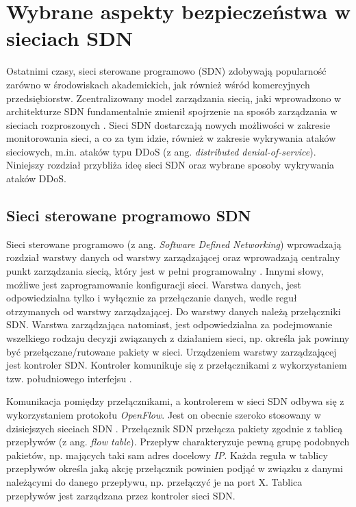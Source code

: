 \chapter{Wybrane aspekty bezpieczeństwa w sieciach SDN }

Ostatnimi czasy, sieci sterowane programowo (SDN) zdobywają popularność zarówno
w środowiskach akademickich, jak również wśród komercyjnych przedsiębiorstw.
Zcentralizowany model zarządzania siecią, jaki wprowadzono w architekturze SDN
fundamentalnie zmienił spojrzenie na sposób zarządzania w sieciach rozproszonych
\cite{ddosNYarticle}. Sieci SDN dostarczają nowych możliwości w zakresie
monitorowania sieci, a co za tym idzie, również w zakresie wykrywania ataków
sieciowych, m.in. ataków typu DDoS (z ang. \textit{distributed
  denial-of-service}). Niniejszy rozdział przybliża ideę sieci SDN oraz wybrane
sposoby wykrywania ataków DDoS. 

\section{Sieci sterowane programowo SDN}
Sieci sterowane programowo (z ang. \textit{Software Defined Networking})
wprowadzają rozdział warstwy danych od warstwy zarządzającej oraz wprowadzają
centralny punkt zarządzania siecią, który jest w pełni programowalny \cite{onf}.
Innymi słowy, możliwe jest zaprogramowanie konfiguracji sieci. Warstwa danych,
jest odpowiedzialna tylko i wyłącznie za przełączanie danych, wedle reguł
otrzymanych od warstwy zarządzającej. Do warstwy danych należą przełączniki SDN.
Warstwa zarządzająca natomiast, jest odpowiedzialna za podejmowanie wszelkiego
rodzaju decyzji związanych z działaniem sieci, np. określa jak powinny być
przełączane/rutowane pakiety w sieci. Urządzeniem warstwy zarządzającej jest
kontroler SDN. Kontroler komunikuje się z przełącznikami z wykorzystaniem tzw.
południowego interfejsu \cite{sdninterfaces}.

Komunikacja pomiędzy przełącznikami, a kontrolerem w sieci SDN odbywa się z
wykorzystaniem protokołu \textit{OpenFlow}. Jest on obecnie szeroko stosowany w
dzisiejszych sieciach SDN \cite{ddoskoreaarticle}. Przełącznik SDN przełącza
pakiety zgodnie z tablicą przepływów (z ang. \textit{flow table}). Przepływ
charakteryzuje pewną grupę podobnych pakietów, np. mających taki sam adres
docelowy \textit{IP}. Każda reguła w tablicy przepływów określa jaką akcję
przełącznik powinien podjąć w związku z danymi należącymi do danego
przepływu, np. przełączyć je na port X. Tablica przepływów jest zarządzana przez
kontroler sieci SDN.

